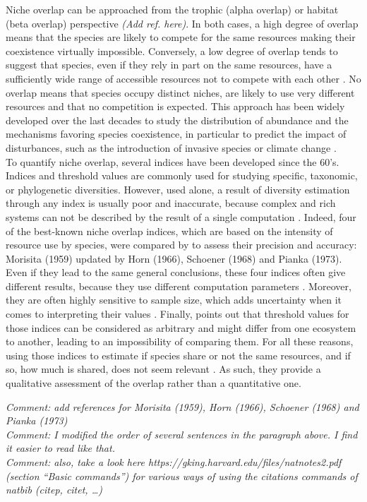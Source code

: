 Niche overlap can be approached from the trophic (alpha overlap) or habitat (beta overlap) perspective \emph{(Add ref. here)}. In both cases, a high degree of overlap means that the species are likely to compete for the same resources making their coexistence virtually impossible. Conversely, a low degree of overlap tends to suggest that species, even if they rely in part on the same resources, have a sufficiently wide range of accessible resources not to compete with each other \citep{mouillot2005}. No overlap means that species occupy distinct niches, are likely to use very different resources and that no competition is expected. This approach has been widely developed over the last decades to study the distribution of abundance and the mechanisms favoring species coexistence, in particular to predict the impact of disturbances, such as the introduction of invasive species or climate change \citep{albouy2011,geange2011, martini2020}.\\ To quantify niche overlap, several indices have been developed since the 60’s. Indices and threshold values are commonly used for studying specific, taxonomic, or phylogenetic diversities. However, used alone, a result of diversity estimation through any index is usually poor and inaccurate, because complex and rich systems can not be described by the result of a single computation \citep{mejri2009}. Indeed, four of the best-known niche overlap indices, which are based on the intensity of resource use by species, were compared by \citet{linton1981} to assess their precision and accuracy: Morisita (1959) updated by Horn (1966), Schoener (1968) and Pianka (1973). Even if they lead to the same general conclusions, these four indices often give different results, because they use different computation parameters \citep{blondel1979}. Moreover, they are often highly sensitive to sample size, which adds uncertainty when it comes to interpreting their values \citep{linton1981}. Finally, \citet{grossman2009} points out that threshold values for those indices can be considered as arbitrary and might differ from one ecosystem to another, leading to an impossibility of comparing them. For all these reasons, using those indices to estimate if species share or not the same resources, and if so, how much is shared, does not seem relevant \citep{mouillot2005}. As such, they provide a qualitative assessment of the overlap rather than a quantitative one. 

\emph{Comment: add references for Morisita (1959), Horn (1966), Schoener (1968) and Pianka (1973)}\\
\emph{Comment: I modified the order of several sentences in the paragraph above. I find it easier to read like that.}\\
\emph{Comment: also, take a look here https://gking.harvard.edu/files/natnotes2.pdf (section ``Basic commands'') for various ways of using the citations commands of natbib (citep, citet, \ldots{})}

